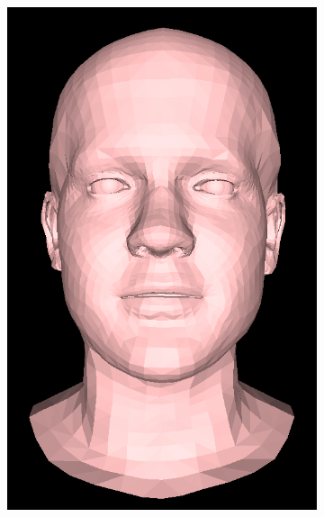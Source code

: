 \begin{figure}[h!]
\begin{subfigure}[b]{0.19\textwidth}
        \includegraphics[width=\textwidth]{figures/gen_sample/00025.png}
    \end{subfigure}
    \begin{subfigure}[b]{0.19\textwidth}

\end{subfigure}
\end{figure}
